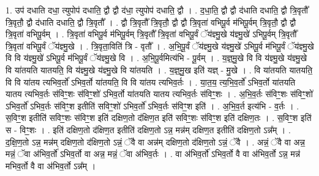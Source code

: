 \documentclass[17pt]{extarticle}
\begin{document}
1. उप॑ दधाति दधा॒ त्युपोप॑ दधाति॒ द्वौ द्वौ द॑धा॒ त्युपोप॑ दधाति॒ द्वौ । . द॒धा॒ति॒ द्वौ द्वौ द॑धाति दधाति॒ द्वौ त्रि॒वृतौ᳚ त्रि॒वृतौ॒ द्वौ द॑धाति दधाति॒ द्वौ त्रि॒वृतौ᳚ । . द्वौ त्रि॒वृतौ᳚ त्रि॒वृतौ॒ द्वौ द्वौ त्रि॒वृता॑ वभिपू॒र्व म॑भिपू॒र्वम् त्रि॒वृतौ॒ द्वौ द्वौ त्रि॒वृता॑ वभिपू॒र्वम् । . त्रि॒वृता॑ वभिपू॒र्व म॑भिपू॒र्वम् त्रि॒वृतौ᳚ त्रि॒वृता॑ वभिपू॒र्वं ॅय॑ज्ञ्मु॒खे य॑ज्ञ्मु॒खे॑ ऽभिपू॒र्वम् त्रि॒वृतौ᳚ त्रि॒वृता॑ वभिपू॒र्वं ॅय॑ज्ञ्मु॒खे । . त्रि॒वृता॒विति॑ त्रि - वृतौ᳚ । . अ॒भि॒पू॒र्वं ॅय॑ज्ञ्मु॒खे य॑ज्ञ्मु॒खे॑ ऽभिपू॒र्व म॑भिपू॒र्वं ॅय॑ज्ञ्मु॒खे वि वि य॑ज्ञ्मु॒खे॑ ऽभिपू॒र्व म॑भिपू॒र्वं ॅय॑ज्ञ्मु॒खे वि । . अ॒भि॒पू॒र्वमित्य॑भि - पू॒र्वम् । . य॒ज्ञ्॒मु॒खे वि वि य॑ज्ञ्मु॒खे य॑ज्ञ्मु॒खे वि या॑तयति यातयति॒ वि य॑ज्ञ्मु॒खे य॑ज्ञ्मु॒खे वि या॑तयति । . य॒ज्ञ्॒मु॒ख इति॑ यज्ञ् - मु॒खे । . वि या॑तयति यातयति॒ वि वि या॑तय त्यभिव॒र्तो॑ ऽभिव॒र्तो या॑तयति॒ वि वि या॑तय त्यभिव॒र्तः । . या॒त॒य॒ त्य॒भि॒व॒र्तो॑ ऽभिव॒र्तो या॑तयति यातय त्यभिव॒र्तः स॑विꣳ॒॒शः स॑विꣳ॒॒शो॑ ऽभिव॒र्तो या॑तयति यातय त्यभिव॒र्तः स॑विꣳ॒॒शः । . अ॒भि॒व॒र्तः स॑विꣳ॒॒शः स॑विꣳ॒॒शो॑ ऽभिव॒र्तो॑ ऽभिव॒र्तः स॑विꣳ॒॒श इतीति॑ सविꣳ॒॒शो॑ ऽभिव॒र्तो॑ ऽभिव॒र्तः स॑विꣳ॒॒श इति॑ । . अ॒भि॒व॒र्त इत्य॑भि - व॒र्तः । . स॒विꣳ॒॒श इतीति॑ सविꣳ॒॒शः स॑विꣳ॒॒श इति॑ दक्षिण॒तो द॑क्षिण॒त इति॑ सविꣳ॒॒शः स॑विꣳ॒॒श इति॑ दक्षिण॒तः । . स॒विꣳ॒॒श इति॑ स - विꣳ॒॒शः । . इति॑ दक्षिण॒तो द॑क्षिण॒त इतीति॑ दक्षिण॒तो ऽन्न॒ मन्न॑म् दक्षिण॒त इतीति॑ दक्षिण॒तो ऽन्न᳚म् । . द॒क्षि॒ण॒तो ऽन्न॒ मन्न॑म् दक्षिण॒तो द॑क्षिण॒तो ऽन्नं॒ ॅवै वा अन्न॑म् दक्षिण॒तो द॑क्षिण॒तो ऽन्नं॒ ॅवै । . अन्नं॒ ॅवै वा अन्न॒ मन्नं॒ ॅवा अ॑भिव॒र्तो॑ ऽभिव॒र्तो वा अन्न॒ मन्नं॒ ॅवा अ॑भिव॒र्तः । . वा अ॑भिव॒र्तो॑ ऽभिव॒र्तो वै वा अ॑भिव॒र्तो ऽन्न॒ मन्न॑ मभिव॒र्तो वै वा अ॑भिव॒र्तो ऽन्न᳚म् । \newline
\end{document}
